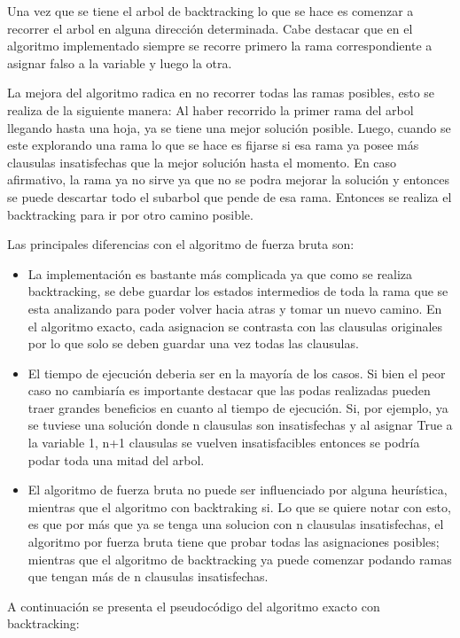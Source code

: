 \documentclass[a4paper,10pt]{article}
\begin{document}
Una vez que se tiene el arbol de backtracking lo que se hace es comenzar a recorrer el arbol en alguna direcci\'on determinada. Cabe destacar que en el algoritmo implementado siempre se recorre primero la rama correspondiente a asignar falso a la variable y luego la otra.

La mejora del algoritmo radica en no recorrer todas las ramas posibles, esto se realiza de la siguiente manera: Al haber recorrido la primer rama del arbol llegando hasta una hoja, ya se tiene una mejor soluci\'on posible. Luego, cuando se este explorando una rama lo que se hace es fijarse si esa rama ya posee m\'as clausulas insatisfechas que la mejor soluci\'on hasta el momento. En caso afirmativo, la rama ya no sirve ya que no se podra mejorar la soluci\'on y entonces se puede descartar todo el subarbol que pende de esa rama. Entonces se realiza el backtracking para ir por otro camino posible. 

Las principales diferencias con el algoritmo de fuerza bruta son:
\begin{itemize}
\item La implementaci\'on es bastante m\'as complicada ya que como se realiza backtracking, se debe guardar los estados intermedios de toda la rama que se esta analizando para poder volver hacia atras y tomar un nuevo camino. En el algoritmo exacto, cada asignacion se contrasta con las clausulas originales por lo que solo se deben guardar una vez todas las clausulas.
\item El tiempo de ejecuci\'on deberia ser en la mayor\'ia de los casos. Si bien el peor caso no cambiar\'ia es importante destacar que las podas realizadas pueden traer grandes beneficios en cuanto al tiempo de ejecuci\'on. Si, por ejemplo, ya se tuviese una soluci\'on donde n clausulas son insatisfechas y al asignar True a la variable 1, n+1 clausulas se vuelven insatisfacibles entonces se podr\'ia podar toda una mitad del arbol.
\item El algoritmo de fuerza bruta no puede ser influenciado por alguna heur\'istica, mientras que el algoritmo con backtraking si. Lo que se quiere notar con esto, es que por m\'as que ya se tenga una solucion con n clausulas insatisfechas, el algoritmo por fuerza bruta tiene que probar todas las asignaciones posibles; mientras que el algoritmo de backtracking ya puede comenzar podando ramas que tengan m\'as de n clausulas insatisfechas.
\end{itemize}

A continuaci\'on se presenta el pseudoc\'odigo del algoritmo exacto con backtracking:
\end{document}

